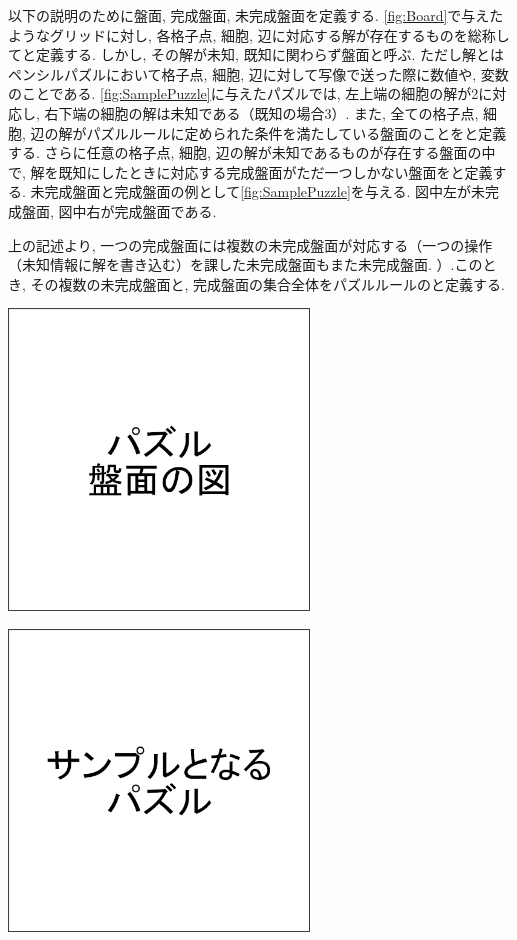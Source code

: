 以下の説明のために盤面, 完成盤面, 未完成盤面を定義する. \cref{fig:Board}で与えたようなグリッドに対し, 各格子点, 細胞, 辺に対応する解が存在するものを総称してと定義する. しかし, その解が未知, 既知に関わらず盤面と呼ぶ. ただし解とはペンシルパズルにおいて格子点, 細胞, 辺に対して写像で送った際に数値や, 変数のことである. \cref{fig:SamplePuzzle}に与えたパズルでは, 左上端の細胞の解が2に対応し, 右下端の細胞の解は未知である（既知の場合3）.
また, 全ての格子点, 細胞, 辺の解がパズルルールに定められた条件を満たしている盤面のことをと定義する. さらに任意の格子点, 細胞, 辺の解が未知であるものが存在する盤面の中で, 解を既知にしたときに対応する完成盤面がただ一つしかない盤面をと定義する. 未完成盤面と完成盤面の例として\cref{fig:SamplePuzzle}を与える. 図中左が未完成盤面, 図中右が完成盤面である.

上の記述より, 一つの完成盤面には複数の未完成盤面が対応する（一つの操作（未知情報に解を書き込む）を課した未完成盤面もまた未完成盤面. ）.このとき, その複数の未完成盤面と, 完成盤面の集合全体をパズルルールのと定義する.

\begin{clearpagefigure}

  \includegraphics[width=8cm,clip]{fig/board.png}
  \caption{}
  \label{fig:Board}
\end{clearpagefigure}

\begin{clearpagefigure}
  \includegraphics[width=8cm,clip]{fig/samplePuzzle.png}
  \caption{}
  \label{fig:SamplePuzzle}
\end{clearpagefigure}

